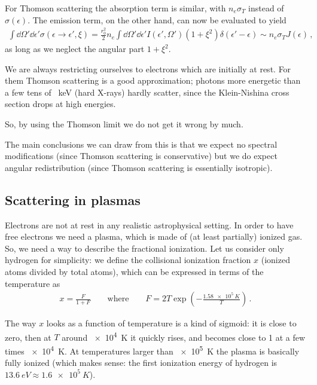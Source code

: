 \documentclass[main.tex]{subfiles}
\begin{document}
For Thomson scattering the absorption term is similar, with \(n_e \sigma_T\) instead of \(\sigma (\epsilon )\). 
The emission term, on the other hand, can now be evaluated to yield  
%
\begin{align}
\int \dd{\Omega }' \dd{\epsilon }' \sigma (\epsilon \to \epsilon ', \xi )
= \frac{r_0^2}{2} n_e \int \dd{\Omega '} \dd{\epsilon '} I(\epsilon ', \Omega ') (1 + \xi^2) \delta (\epsilon ' - \epsilon ) \sim n_e \sigma_T J(\epsilon )
\,,
\end{align}
%
as long as we neglect the angular part \(1 + \xi^2\). 

We are always restricting ourselves to electrons which are initially at rest. For them Thomson scattering is a good approximation; photons more energetic than a few tens of \SI{}{keV} (hard X-rays) hardly scatter, since the Klein-Nishina cross section drops at high energies.

So, by using the Thomson limit we do not get it wrong by much. 

The main conclusions we can draw from this is that we expect no spectral modifications (since Thomson scattering is conservative) but we do expect angular redistribution (since Thomson scattering is essentially isotropic).

\subsection{Scattering in plasmas}

Electrons are not at rest in any realistic astrophysical setting. In order to have free electrons we need a plasma, which is made of (at least partially) ionized gas. 
So, we need a way to describe the fractional ionization.
Let us consider only hydrogen for simplicity: we define the collisional ionization fraction \(x\) (ionized atoms divided by total atoms), which can be expressed in terms of the temperature as 
%
\begin{align}
x = \frac{F}{1 + F} 
\qquad \text{where} \qquad
F = 2T \exp(-\frac{\SI{1.58e5}{K}}{T})
\,.
\end{align}

The way \(x\) looks as a function of temperature is a kind of sigmoid: it is close to zero, then at \(T\) around \SI{e4}{K} it quickly rises, and becomes close to 1 at a few times \SI{e4}{K}. At temperatures larger than \SI{e5}{K} the plasma is basically fully ionized (which makes sense: the first ionization energy of hydrogen is \(\SI{13.6}{eV} \approx \SI{1.6e5}{K}\)). 
\end{document}
